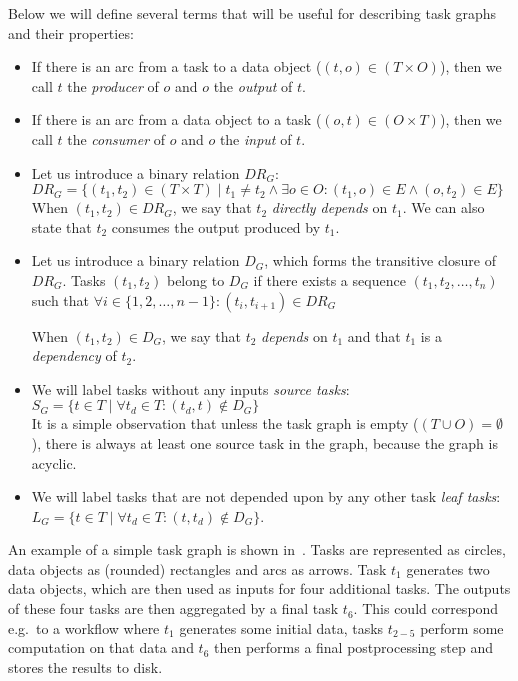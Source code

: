 \vspace{2mm}Below we will define several terms that will be useful for describing task
graphs and their properties:
\begin{itemize}[itemsep=0pt]
	\item If there is an arc from a task to a data object ($(t,o) \in (T\times{}O)$), then we call
	      $t$ the \emph{producer} of $o$ and
	      $o$ the \emph{output} of $t$.
	\item If there is an arc from a data object to a task ($(o,t) \in (O\times{}T)$), then we call
	      $t$ the \emph{consumer} of $o$ and
	      $o$ the \emph{input} of $t$.

	\item Let us introduce a binary relation $DR_G$: \\ $DR_G = \{(t_1, t_2)\in{}(T\times{}T) \mid t_1 \neq t_2 \land
		      \exists{}o\in{}O\colon (t_1, o)\in{}E
		      \land (o, t_2)\in{}E\}$ \\ When
	      $(t_1, t_2) \in DR_G$, we say that $t_2$ \emph{directly depends} on
	      $t_1$. We can also state that $t_2$ consumes the output produced
	      by $t_1$.

	\item Let us introduce a binary relation $D_G$, which forms the transitive closure of
	      $DR_G$. Tasks $(t_1, t_2)$ belong to $D_G$ if there
	      exists a sequence $(t_1, t_2, \ldots, t_n)$ such that $\forall i \in \{1,2,\ldots,n - 1\}: (t_i, t_{i+1}) \in DR_G$

	      When $(t_1, t_2) \in D_G$, we say that $t_2$ \emph{depends} on
	      $t_1$ and that $t_1$ is a \emph{dependency} of
	      $t_2$.

	\item We will label tasks without any inputs \emph{source tasks}: \\ $S_G = \{ t\in{}T \mid
		      \forall{}t_d\in{}T\colon (t_d, t)\notin D_G\}$ \\ It is a
	      simple observation that unless the task graph is empty ($(T\cup{}O) = \emptyset$), there is always at
	      least one source task in the graph, because the graph is acyclic.
	\item We will label tasks that are not depended upon by any other task \emph{leaf tasks}: \\
	      $L_G = \{ t\in{}T \mid \forall{}t_d\in{}T: (t,
		      t_d)\notin D_G\}$.
\end{itemize}

An example of a simple task graph is shown in~. Tasks are represented as
circles, data objects as (rounded) rectangles and arcs as arrows. Task $t_1$
generates two data objects, which are then used as inputs for four additional tasks. The outputs of
these four tasks are then aggregated by a final task $t_6$. This could correspond
e.g.\ to a workflow where $t_1$ generates some initial data, tasks
$t_{2-5}$ perform some computation on that data and $t_6$ then
performs a final postprocessing step and stores the results to disk.

